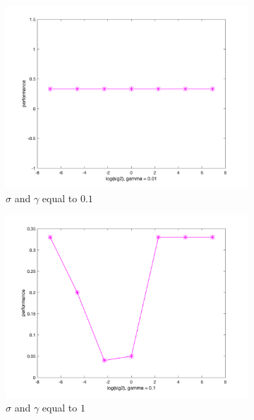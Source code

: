 \documentclass[a4paper, 11pt, one column]{article}
\begin{document}
\begin{figure}[]
        \begin{subfigure}{0.33\linewidth}
            \includegraphics[width=\linewidth]{images/loo_sig2_g_0.01.png}
            \caption{$\sigma$ and $\gamma$ equal to $0.1$}
        \end{subfigure}
        \begin{subfigure}{0.33\linewidth}
            \includegraphics[width=\linewidth]{images/loo_sig2_g_0.1.png}
            \caption{$\sigma$ and $\gamma$ equal to $1$}
        \end{subfigure}
        \begin{subfigure}{0.33\linewidth}

\end{subfigure}
\end{figure}
\end{document}

